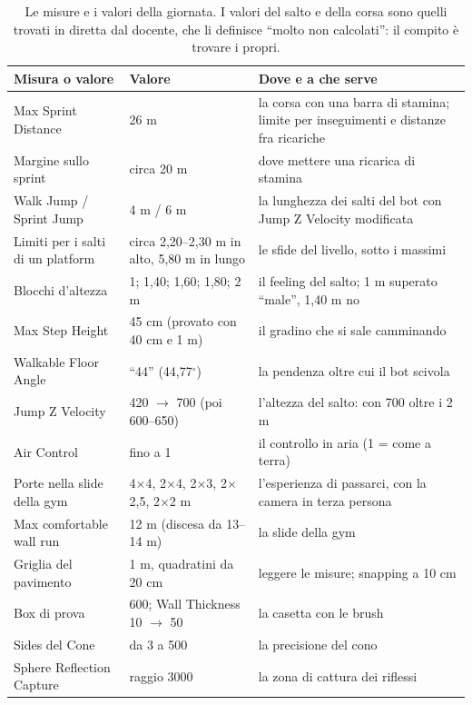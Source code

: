 \begin{table}[htbp]
\centering
\small
\begin{tabular}{@{}p{4.6cm}p{3.2cm}p{6.2cm}@{}}
\toprule
\textbf{Misura o valore} & \textbf{Valore} & \textbf{Dove e a che serve} \\
\midrule
Max Sprint Distance & 26 m & la corsa con una barra di stamina; limite per inseguimenti e
distanze fra ricariche \\
Margine sullo sprint & circa 20 m & dove mettere una ricarica di stamina \\
Walk Jump / Sprint Jump & 4 m / 6 m & la lunghezza dei salti del bot con Jump Z Velocity
modificata \\
Limiti per i salti di un platform & circa 2,20--2,30 m in alto, 5,80 m in lungo & le sfide
del livello, sotto i massimi \\
Blocchi d'altezza & 1; 1,40; 1,60; 1,80; 2 m & il feeling del salto; 1 m superato
``male'', 1,40 m no \\
Max Step Height & 45 cm (provato con 40 cm e 1 m) & il gradino che si sale camminando \\
Walkable Floor Angle & ``44'' (44,77$^\circ$) & la pendenza oltre cui il bot scivola \\
Jump Z Velocity & 420 $\to$ 700 (poi 600--650) & l'altezza del salto: con 700 oltre i 2 m \\
Air Control & fino a 1 & il controllo in aria (1 = come a terra) \\
Porte nella slide della gym & 4$\times$4, 2$\times$4, 2$\times$3, 2$\times$2,5,
2$\times$2 m & l'esperienza di passarci, con la camera in terza persona \\
Max comfortable wall run & 12 m (discesa da 13--14 m) & la slide della gym \\
Griglia del pavimento & 1 m, quadratini da 20 cm & leggere le misure; snapping a 10 cm \\
Box di prova & 600; Wall Thickness 10 $\to$ 50 & la casetta con le brush \\
Sides del Cone & da 3 a 500 & la precisione del cono \\
Sphere Reflection Capture & raggio 3000 & la zona di cattura dei riflessi \\
\bottomrule
\end{tabular}
\caption{Le misure e i valori della giornata. I valori del salto e della corsa sono quelli
trovati in diretta dal docente, che li definisce ``molto non calcolati'': il compito è
trovare i propri.}
\label{ue13:tab:misure}
\end{table}

